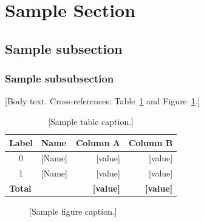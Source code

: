 \section{Sample Section}

\subsection{Sample subsection}

\subsubsection{Sample subsubsection}
[Body text. Cross-references: Table~\ref{tab:sample} and Figure~\ref{fig:sample}.]

\begin{table}[htbp]
\centering
\caption{[Sample table caption.]}\label{tab:sample}
\begin{tabular}{clrr}
\toprule
\textbf{Label} & \textbf{Name} & \textbf{Column A} & \textbf{Column B} \\
\midrule
0 & [Name] & [value] & [value] \\
1 & [Name] & [value] & [value] \\
\midrule
\multicolumn{2}{l}{\textbf{Total}} & \textbf{[value]} & \textbf{[value]} \\
\bottomrule
\end{tabular}
\end{table}

\begin{figure}[htbp]
\centering
{}
\caption{[Sample figure caption.]}\label{fig:sample}
\end{figure}
